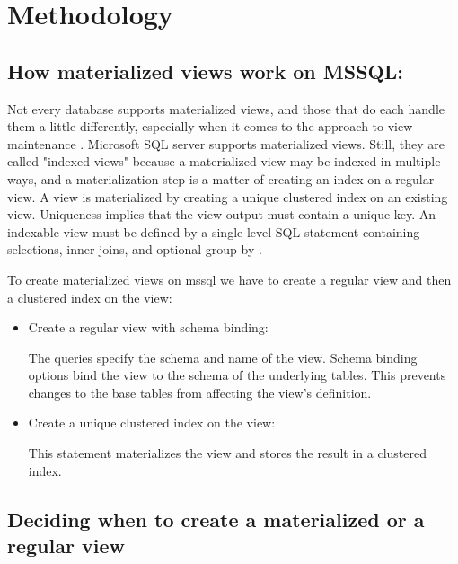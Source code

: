 \section{Methodology}\vspace{.4cm}

 \subsection{ How materialized views work on MSSQL:} Not every database supports materialized views, and those that do each handle them a little differently, especially when it comes to the approach to view maintenance \cite{hattemer-2020}. Microsoft SQL server supports materialized views. Still, they are called "indexed views" because a materialized view may be indexed in multiple ways, and a materialization step is a matter of creating an index on a regular view. A view is materialized by creating a unique clustered index on an existing view. Uniqueness implies that the view output must contain a unique key. An indexable view must be defined by a single-level SQL statement containing selections, inner joins, and optional group-by \cite{goldstein-2001}.\vspace{0.8cm}

 To create materialized views on mssql we have to create a  regular view and then a clustered index on the view:
 \begin{itemize}
     \item {Create a regular view with schema binding:}\vspace{0.4cm}
     

The queries specify the schema and name of the view. Schema binding options bind the view to the schema of the underlying tables. This prevents changes to the base tables from affecting the view's definition.
      \item {Create a unique clustered index on the view:}\vspace{0.4cm}
      
 \vspace{0.4cm}

This statement materializes the view and stores the result in a clustered index.
\end{itemize}



 
\subsection{Deciding when to create a materialized or a regular view}\vspace{0.4cm}

